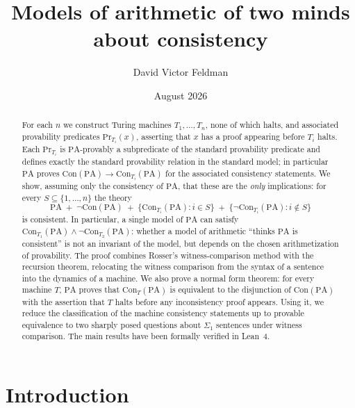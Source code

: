 \documentclass[11pt]{amsart}
\title[Of two minds about consistency]{Models of arithmetic of two minds about consistency}
\author{David Victor Feldman}
\date{August 2026}
\theoremstyle{definition}
\theoremstyle{remark}
\newcommand{\PA}{\mathrm{PA}}
\newcommand{\Con}{\mathrm{Con}}
\newcommand{\Prov}{\mathrm{Pr}}
\begin{document}
\begin{abstract}
For each $n$ we construct Turing machines $T_1,\dots,T_n$, none of which
halts, and associated provability predicates
$\Prov_{T_i}(x)$, asserting that $x$ has a proof appearing before $T_i$
halts. Each $\Prov_{T_i}$ is $\PA$-provably a subpredicate of the standard
provability predicate and defines exactly the standard provability relation
in the standard model; in particular $\PA$ proves
$\Con(\PA)\to\Con_{T_i}(\PA)$ for the associated consistency statements.
We show, assuming only the consistency of $\PA$, that these are the
\emph{only} implications: for every $S\subseteq\{1,\dots,n\}$ the theory
\[
\PA \;+\; \neg\Con(\PA) \;+\; \{\Con_{T_i}(\PA) : i\in S\}
        \;+\; \{\neg\Con_{T_i}(\PA) : i\notin S\}
\]
is consistent. In particular, a single model of $\PA$ can satisfy
$\Con_{T_1}(\PA)\wedge\neg\Con_{T_2}(\PA)$: whether a model of arithmetic
``thinks $\PA$ is consistent'' is not an invariant of the model, but
depends on the chosen arithmetization of provability. The proof combines
Rosser's witness-comparison method with the recursion theorem, relocating
the witness comparison from the syntax of a sentence into the dynamics of
a machine. We also prove a normal form theorem: for every machine $T$,
$\PA$ proves that $\Con_T(\PA)$ is equivalent to the disjunction of
$\Con(\PA)$ with the assertion that $T$ halts before any inconsistency
proof appears. Using it, we reduce the classification of the machine
consistency statements up to provable equivalence to two sharply posed
questions about $\Sigma_1$ sentences under witness comparison. The main
results have been formally verified in Lean~4.
\end{abstract}

\maketitle

\section{Introduction}
\end{document}
